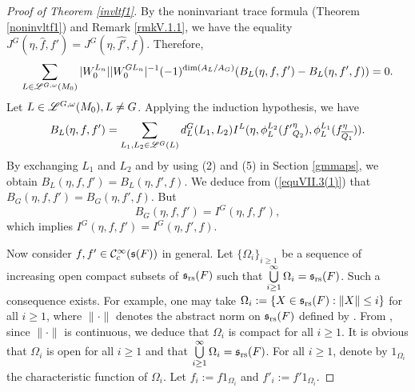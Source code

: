 \documentclass[a4paper]{amsart}
\newcommand{\ov}{\overline}
\theoremstyle{definition}
\theoremstyle{remark}
\numberwithin{equation}{subsection}
\begin{document}
\begin{proof}[Proof of Theorem \ref{invltf1}]
By the noninvariant trace formula (Theorem \ref{noninvltf1}) and Remark \ref{rmkV.1.1}, we have the equality $J^G(\eta, \hat{f}, f')=J^G(\eta, \hat{f'}, f)$. Therefore, 
\begin{equation}\label{equVII.3(1)}
 \sum_{L\in\mathscr{L}^{G,\omega}(M_0)} |W_0^{L_n}| |W_0^{GL_n}|^{-1} (-1)^{\dim(A_L/A_G)} (B_L(\eta, f, f')-B_L(\eta, f', f))=0. 
\end{equation}
Let $L\in\mathscr{L}^{G,\omega}(M_0), L\neq G$. Applying the induction hypothesis, we have
$$ B_L(\eta, f, f')=\sum_{L_1,L_2\in\msl^G(L)} d_L^G(L_1,L_2) I^L(\eta, \phi_L^{L_2}({f'}_{Q_2}^\eta), \phi_L^{L_1}(f_{\ov{Q_1}}^\eta)). $$
By exchanging $L_1$ and $L_2$ and by using (2) and (5) in Section \ref{gmmaps}, we obtain $B_L(\eta, f, f')=B_L(\eta, f', f)$. We deduce from (\ref{equVII.3(1)}) that $B_G(\eta, f, f')=B_G(\eta, f', f)$. But
$$ B_G(\eta, f, f')=I^G(\eta, f, f'), $$
which implies $I^G(\eta, f, f')=I^G(\eta, f', f)$. 

Now consider $f, f'\in{\mathcal {C}}_c^\infty({\mathfrak{s}}(F))$ in general. Let $\{\Omega_i\}_{i\geq1}$ be a sequence of increasing open compact subsets of ${\mathfrak{s}}_{\mathrm{rs}}(F)$ such that $\bigcup\limits_{i\geq1}^\infty \Omega_i={\mathfrak{s}}_{\mathrm{rs}}(F)$. Such a consequence exists. For example, one may take $\Omega_i:=\{X\in{\mathfrak{s}}_{\mathrm{rs}}(F): \|X\|\leq i\}$ for all $i\geq 1$, where $\|\cdot\|$ denotes the abstract norm on ${\mathfrak{s}}_{\mathrm{rs}}(F)$ defined by \cite[(18.2.1) in \S18.2]{MR2192014}. From \cite[Proposition 18.1.(3)]{MR2192014}, since $\|\cdot\|$ is continuous, we deduce that $\Omega_i$ is compact for all $i\geq1$. It is obvious that $\Omega_i$ is open for all $i\geq1$ and that $\bigcup\limits_{i\geq1}^\infty \Omega_i={\mathfrak{s}}_{\mathrm{rs}}(F)$. For all $i\geq1$, denote by $1_{\Omega_i}$ the characteristic function of $\Omega_i$. Let $f_i:=f 1_{\Omega_i}$ and $f'_i:=f' 1_{\Omega_i}$. 


\end{proof}
\end{document}
